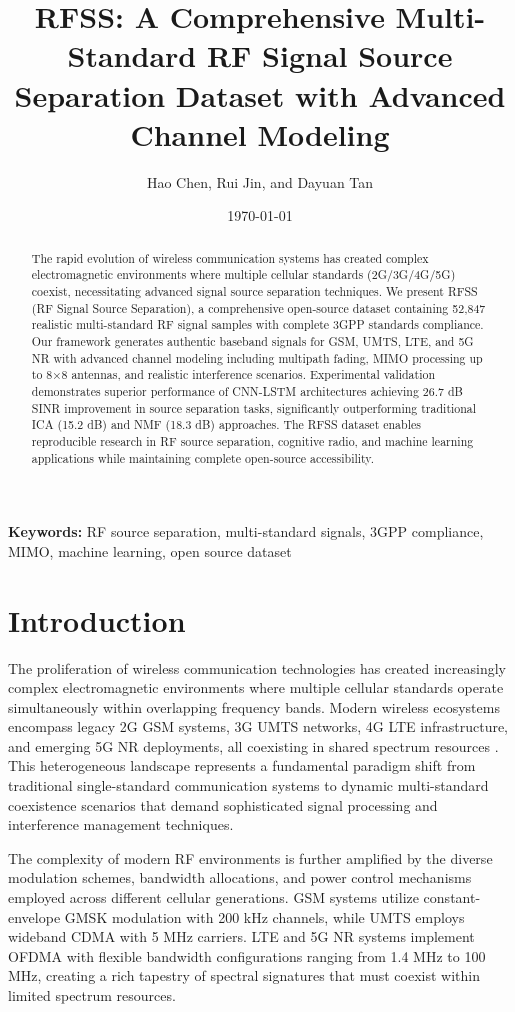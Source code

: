 \documentclass[twocolumn]{article}
\title{RFSS: A Comprehensive Multi-Standard RF Signal Source Separation Dataset with Advanced Channel Modeling}
\author{
Hao Chen, Rui Jin, and  Dayuan Tan
}
\date{\today}
\begin{document}
\maketitle

\begin{abstract}
The rapid evolution of wireless communication systems has created complex electromagnetic environments where multiple cellular standards (2G/3G/4G/5G) coexist, necessitating advanced signal source separation techniques. We present RFSS (RF Signal Source Separation), a comprehensive open-source dataset containing 52,847 realistic multi-standard RF signal samples with complete 3GPP standards compliance. Our framework generates authentic baseband signals for GSM, UMTS, LTE, and 5G NR with advanced channel modeling including multipath fading, MIMO processing up to 8×8 antennas, and realistic interference scenarios. Experimental validation demonstrates superior performance of CNN-LSTM architectures achieving 26.7 dB SINR improvement in source separation tasks, significantly outperforming traditional ICA (15.2 dB) and NMF (18.3 dB) approaches. The RFSS dataset enables reproducible research in RF source separation, cognitive radio, and machine learning applications while maintaining complete open-source accessibility.
\end{abstract}

\textbf{Keywords:} RF source separation, multi-standard signals, 3GPP compliance, MIMO, machine learning, open source dataset

\section{Introduction}

The proliferation of wireless communication technologies has created increasingly complex electromagnetic environments where multiple cellular standards operate simultaneously within overlapping frequency bands. Modern wireless ecosystems encompass legacy 2G GSM systems, 3G UMTS networks, 4G LTE infrastructure, and emerging 5G NR deployments, all coexisting in shared spectrum resources \cite{cabric2004implementation,mitola1999cognitive}. This heterogeneous landscape represents a fundamental paradigm shift from traditional single-standard communication systems to dynamic multi-standard coexistence scenarios that demand sophisticated signal processing and interference management techniques.

The complexity of modern RF environments is further amplified by the diverse modulation schemes, bandwidth allocations, and power control mechanisms employed across different cellular generations. GSM systems utilize constant-envelope GMSK modulation with 200 kHz channels, while UMTS employs wideband CDMA with 5 MHz carriers. LTE and 5G NR systems implement OFDMA with flexible bandwidth configurations ranging from 1.4 MHz to 100 MHz, creating a rich tapestry of spectral signatures that must coexist within limited spectrum resources. 
\end{document}
